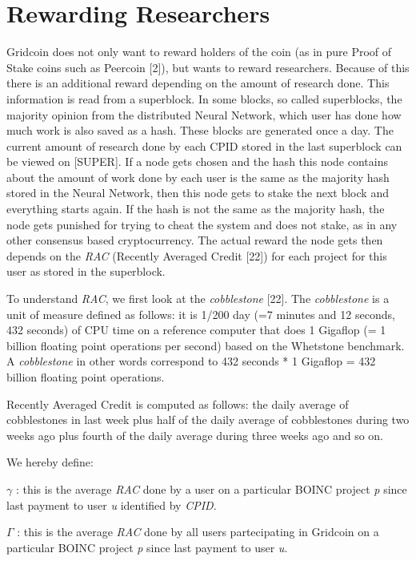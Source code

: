 \section{Rewarding Researchers}

Gridcoin does not only want to reward holders of the coin (as in pure Proof of Stake coins such as Peercoin [2]), but wants to reward researchers. Because of this there is an additional reward depending on the amount of research done. This information is read from a superblock. In some blocks, so called superblocks, the majority opinion from the distributed Neural Network, which user has done how much work is also saved as a hash. These blocks are generated once a day. The current amount of research done by each CPID stored in the last superblock can be viewed on [SUPER]. If a node gets chosen and the hash this node contains about the amount of work done by each user is the same as the majority hash stored in the Neural Network, then this node gets to stake the next block and everything starts again. If the hash is not the same as the majority hash, the node gets punished for trying to cheat the system and does not stake, as in any other consensus based cryptocurrency. The actual reward the node gets then depends on the \textit{RAC} (Recently Averaged Credit [22]) for each project for this user as stored in the superblock.

To understand \textit{RAC}, we first look at the \textit{cobblestone} [22]. The \textit{cobblestone} is a unit of measure defined as follows: it is 1/200 day (=7 minutes and 12 seconds, 432 seconds) of CPU time on a reference computer that does 1 Gigaflop (= 1 billion floating point operations per second) based on the Whetstone benchmark. A \textit{cobblestone} in other words correspond to 432 seconds * 1 Gigaflop = 432 billion floating point operations.

Recently Averaged Credit is computed as follows: the daily average of cobblestones in last week plus half of the daily average of cobblestones during two weeks ago plus fourth of the daily average during three weeks ago and so on. 

We hereby define:
\begin{description}
  \item{$\gamma$} : this is the average \textit{RAC} done by a user on a particular BOINC project \textit{p} since last payment to user \textit{u} identified by \textit{CPID}.
  \item{$\Gamma$} : this is the average \textit{RAC} done by all users partecipating in Gridcoin on a particular BOINC project \textit{p} since last payment to user \textit{u}.
\end{description}


